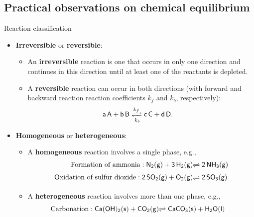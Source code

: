 %
%
\subsection{Practical observations on chemical equilibrium}
%
%
\begin{frame}{Reaction classification}
	\begin{itemize}
		\item \alert{\bf Irreversible} or \alert{\bf reversible}:
		\begin{itemize}
			\item An {\bf irreversible} reaction is one that occurs in only one direction and continues in this direction until at least one of the reactants is depleted.
			\item A {\bf reversible} reaction can occur in both directions (with forward and backward reaction reaction coefficients $k_f$ and $k_b$, respectively):
			\[	
			\mathsf{a\,A + b\,B} \xrightleftharpoons[k_b]{k_f} \mathsf{c\,C + d\,D}.
			\quad
			\]
		\end{itemize}
		\pause
		\item \alert{\bf Homogeneous} or \alert{\bf heterogeneous}:
		\begin{itemize}
			\item A {\bf homogeneous} reaction involves a single phase, e.g., 
			\begin{alignat*}{2}
				\mbox{Formation of ammonia}:  \mathsf{N_2(g) + 3\,H_2(g) } & \mathsf{\xrightleftharpoons[]{} 2\,NH_3(g)}\\
				\mbox{Oxidation of sulfur dioxide}: \mathsf{2\,SO_2(g) + O_2(g) } & \mathsf{\xrightleftharpoons[]{} 2\,SO_3(g)} 
			\end{alignat*}
			\item A {\bf heterogeneous} reaction involves more than one phase, e.g., 
			\begin{alignat*}{2}
				\mbox{Carbonation} : \mathsf{Ca(OH)_2(s) + CO_2(g)} & \mathsf{\xrightleftharpoons[]{} CaCO_3(s) + H_2O(l)}
			\end{alignat*}
		\end{itemize}
		
	\end{itemize}
\end{frame}
